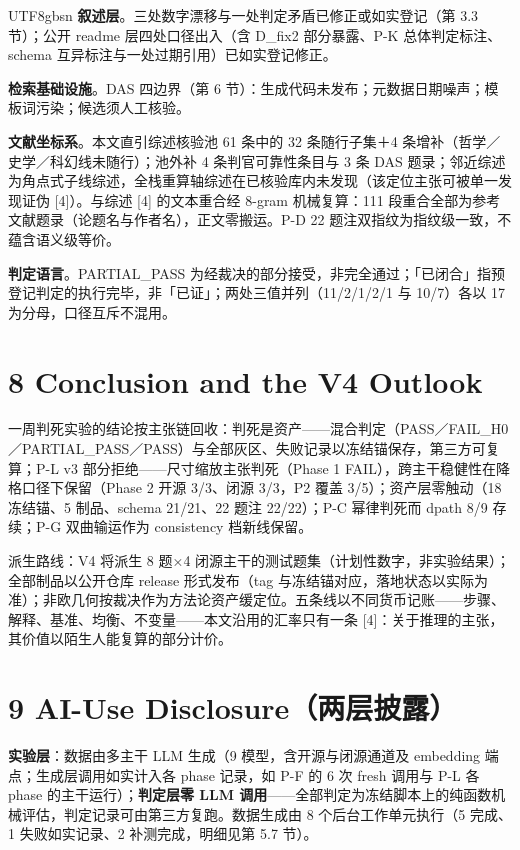 \documentclass[10pt,a4paper]{article}
\begin{document}
\begin{CJK}{UTF8}{gbsn}
\textbf{叙述层}。三处数字漂移与一处判定矛盾已修正或如实登记（第 3.3 节）；公开 readme 层四处口径出入（含 D\_fix2 部分暴露、P-K 总体判定标注、schema 互异标注与一处过期引用）已如实登记修正。

\textbf{检索基础设施}。DAS 四边界（第 6 节）：生成代码未发布；元数据日期噪声；模板词污染；候选须人工核验。

\textbf{文献坐标系}。本文直引综述核验池 61 条中的 32 条随行子集＋4 条增补（哲学／史学／科幻线未随行）；池外补 4 条判官可靠性条目与 3 条 DAS 题录；邻近综述为角点式子线综述，全栈重算轴综述在已核验库内未发现（该定位主张可被单一发现证伪 [4]）。与综述 [4] 的文本重合经 8-gram 机械复算：111 段重合全部为参考文献题录（论题名与作者名），正文零搬运。P-D 22 题注双指纹为指纹级一致，不蕴含语义级等价。

\textbf{判定语言}。PARTIAL\_PASS 为经裁决的部分接受，非完全通过；「已闭合」指预登记判定的执行完毕，非「已证」；两处三值并列（11/2/1/2/1 与 10/7）各以 17 为分母，口径互斥不混用。


\section*{8 Conclusion and the V4 Outlook}一周判死实验的结论按主张链回收：判死是资产——混合判定（PASS／FAIL\_H0／PARTIAL\_PASS／PASS）与全部灰区、失败记录以冻结锚保存，第三方可复算；P-L v3 部分拒绝——尺寸缩放主张判死（Phase 1 FAIL），跨主干稳健性在降格口径下保留（Phase 2 开源 3/3、闭源 3/3，P2 覆盖 3/5）；资产层零触动（18 冻结锚、5 制品、schema 21/21、22 题注 22/22）；P-C 幂律判死而 dpath 8/9 存续；P-G 双曲输运作为 consistency 档新线保留。

派生路线：V4 将派生 8 题×4 闭源主干的测试题集（计划性数字，非实验结果）；全部制品以公开仓库 release 形式发布（tag 与冻结锚对应，落地状态以实际为准）；非欧几何按裁决作为方法论资产缓定位。五条线以不同货币记账——步骤、解释、基准、均衡、不变量——本文沿用的汇率只有一条 [4]：关于推理的主张，其价值以陌生人能复算的部分计价。


\section*{9 AI-Use Disclosure（两层披露）}\textbf{实验层}：数据由多主干 LLM 生成（9 模型，含开源与闭源通道及 embedding 端点；生成层调用如实计入各 phase 记录，如 P-F 的 6 次 fresh 调用与 P-L 各 phase 的主干运行）；\textbf{判定层零 LLM 调用}——全部判定为冻结脚本上的纯函数机械评估，判定记录可由第三方复跑。数据生成由 8 个后台工作单元执行（5 完成、1 失败如实记录、2 补测完成，明细见第 5.7 节）。


\end{CJK}
\end{document}
